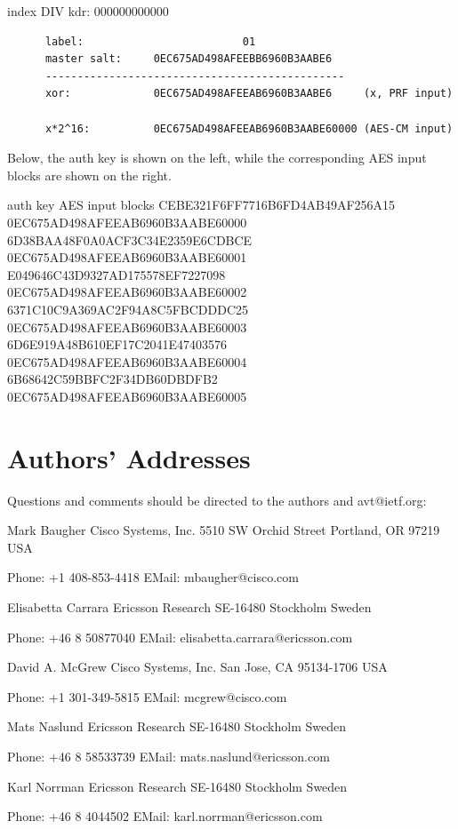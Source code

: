 \documentclass{article}
\begin{document}
index DIV kdr:                   000000000000

\begin{verbatim}
      label:                         01
      master salt:     0EC675AD498AFEEBB6960B3AABE6
      -----------------------------------------------
      xor:             0EC675AD498AFEEAB6960B3AABE6     (x, PRF input)

      x*2^16:          0EC675AD498AFEEAB6960B3AABE60000 (AES-CM input)
\end{verbatim}

Below, the auth key is shown on the left, while the corresponding AES input blocks are shown on the right.

auth key                           AES input blocks CEBE321F6FF7716B6FD4AB49AF256A15   0EC675AD498AFEEAB6960B3AABE60000 6D38BAA48F0A0ACF3C34E2359E6CDBCE   0EC675AD498AFEEAB6960B3AABE60001 E049646C43D9327AD175578EF7227098   0EC675AD498AFEEAB6960B3AABE60002 6371C10C9A369AC2F94A8C5FBCDDDC25   0EC675AD498AFEEAB6960B3AABE60003 6D6E919A48B610EF17C2041E47403576   0EC675AD498AFEEAB6960B3AABE60004 6B68642C59BBFC2F34DB60DBDFB2       0EC675AD498AFEEAB6960B3AABE60005

\section*{Authors' Addresses}

Questions and comments should be directed to the authors and avt@ietf.org:

Mark Baugher Cisco Systems, Inc. 5510 SW Orchid Street Portland, OR 97219 USA

Phone:  +1 408-853-4418 EMail:  mbaugher@cisco.com

Elisabetta Carrara Ericsson Research SE-16480 Stockholm Sweden

Phone:  +46 8 50877040 EMail:  elisabetta.carrara@ericsson.com

David A. McGrew Cisco Systems, Inc. San Jose, CA 95134-1706 USA

Phone:  +1 301-349-5815 EMail:  mcgrew@cisco.com

Mats Naslund Ericsson Research SE-16480 Stockholm Sweden

Phone:  +46 8 58533739 EMail:  mats.naslund@ericsson.com

Karl Norrman Ericsson Research SE-16480 Stockholm Sweden

Phone:  +46 8 4044502 EMail:  karl.norrman@ericsson.com
\end{document}
